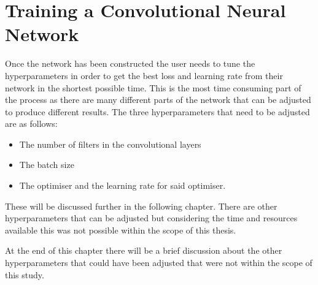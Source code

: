 \chapter{Training a Convolutional Neural Network}
Once the network has been constructed the user needs to tune the hyperparameters in order to get the best loss and learning rate from their network in the shortest possible time. This is the most time consuming part of the process as there are many different parts of the network that can be adjusted to produce different results. The three hyperparameters that need to be adjusted are as follows:
\begin{itemize}
    \item The number of filters in the convolutional layers
    \item The batch size
    \item The optimiser and the learning rate for said optimiser.
\end{itemize}
These will be discussed further in the following chapter. There are other hyperparameters that can be adjusted but considering the time and resources available this was not possible within the scope of this thesis. 
\par
At the end of this chapter there will be a brief discussion about the other hyperparameters that could have been adjusted that were not within the scope of this study. 
